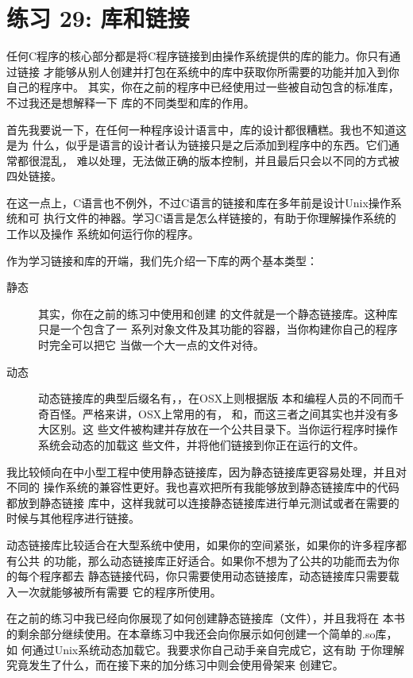 \chapter{练习 29: 库和链接}

任何C程序的核心部分都是将C程序链接到由操作系统提供的库的能力。你只有通过链接
才能够从别人创建并打包在系统中的库中获取你所需要的功能并加入到你自己的程序中。
其实，你在之前的程序中已经使用过一些被自动包含的标准库，不过我还是想解释一下
库的不同类型和库的作用。

首先我要说一下，在任何一种程序设计语言中，库的设计都很糟糕。我也不知道这是为
什么，似乎是语言的设计者认为链接只是之后添加到程序中的东西。它们通常都很混乱，
难以处理，无法做正确的版本控制，并且最后只会以不同的方式被四处链接。

在这一点上，C语言也不例外，不过C语言的链接和库在多年前是设计Unix操作系统和可
执行文件的神器。学习C语言是怎么样链接的，有助于你理解操作系统的工作以及操作
系统如何运行你的程序。

作为学习链接和库的开端，我们先介绍一下库的两个基本类型：

\begin{description}
\item[静态] 其实，你在之前的练习中使用和创建
    的文件就是一个静态链接库。这种库只是一个包含了一
    系列对象文件及其功能的容器，当你构建你自己的程序时完全可以把它
    当做一个大一点的文件对待。
\item[动态] 动态链接库的典型后缀名有，，在OSX上则根据版
    本和编程人员的不同而千奇百怪。严格来讲，OSX上常用的有，
    和，而这三者之间其实也并没有多大区别。这
    些文件被构建并存放在一个公共目录下。当你运行程序时操作系统会动态的加载这
    些文件，并将他们链接到你正在运行的文件。
\end{description}

我比较倾向在中小型工程中使用静态链接库，因为静态链接库更容易处理，并且对不同的
操作系统的兼容性更好。我也喜欢把所有我能够放到静态链接库中的代码都放到静态链接
库中，这样我就可以连接静态链接库进行单元测试或者在需要的时候与其他程序进行链接。

动态链接库比较适合在大型系统中使用，如果你的空间紧张，如果你的许多程序都有公共
的功能，那么动态链接库正好适合。如果你不想为了公共的功能而去为你的每个程序都去
静态链接代码，你只需要使用动态链接库，动态链接库只需要载入一次就能够被所有需要
它的程序所使用。

在之前的练习中我已经向你展现了如何创建静态链接库（文件），并且我将在
本书的剩余部分继续使用。在本章练习中我还会向你展示如何创建一个简单的.so库，如
何通过Unix系统动态加载它。我要求你自己动手亲自完成它，这有助
于你理解究竟发生了什么，而在接下来的加分练习中则会使用骨架来
创建它。

